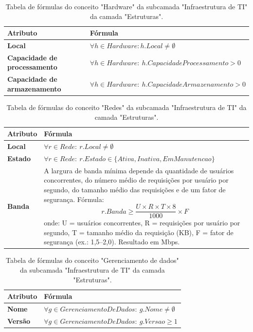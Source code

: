 \begin{apendicesenv}
\begin{table}[H]
\centering
\caption{Tabela de fórmulas do conceito "Hardware" da subcamada "Infraestrutura de TI" da camada "Estruturas".}
\begin{tabularx}{\textwidth}{|l|X|}
\hline
\textbf{Atributo} & \textbf{Fórmula} \\ \hline
\textbf{Local} & $\forall h \in Hardware: h.Local \neq \emptyset$ \\ \hline
\textbf{Capacidade de processamento}  & $\forall h \in Hardware:\ h.CapacidadeProcessamento > 0$ \\ \hline
\textbf{Capacidade de armazenamento} & $\forall h \in Hardware:\ h.CapacidadeArmazenamento > 0$ \\ \hline
\end{tabularx}
\end{table}

\begin{table}[H]
\centering
\caption{Tabela de fórmulas do conceito "Redes" da subcamada "Infraestrutura de TI" da camada "Estruturas".}
\begin{tabularx}{\textwidth}{|l|X|}
\hline
\textbf{Atributo} & \textbf{Fórmula} \\ \hline
\textbf{Local}  & $\forall r \in Rede:\ r.Local \neq \emptyset$ \\ \hline
\textbf{Estado} & $\forall r \in Rede:\ r.Estado \in \{Ativa, Inativa, EmManutencao\}$ \\ \hline
\textbf{Banda} & 
\parbox[t]{0.8\linewidth}{
A largura de banda mínima depende da quantidade de usuários concorrentes, do número médio de requisições por usuário por segundo, do tamanho médio das requisições e de um fator de segurança.  
Fórmula: 
\[
r.Banda \ge \frac{U \times R \times T \times 8}{1000} \times F
\]  
onde: 
U = usuários concorrentes,  
R = requisições por usuário por segundo,  
T = tamanho médio da requisição (KB),  
F = fator de segurança (ex.: 1,5–2,0).  
Resultado em Mbps.
} \\ \hline
\textbf{Segurança} & $\forall r \in Rede:\ r.Seguranca \in \{\text{Alta, Média, Baixa}\}$ \\ \hline
\end{tabularx}
\end{table}

\begin{table}[H]
\centering
\caption{Tabela de fórmulas do conceito "Gerenciamento de dados" da subcamada "Infraestrutura de TI" da camada "Estruturas".}
\begin{tabularx}{\textwidth}{|l|X|}
\hline
\textbf{Atributo} & \textbf{Fórmula} \\ \hline
\textbf{Nome} & $\forall g \in GerenciamentoDeDados:\ g.Nome \neq \emptyset$ \\ \hline
\textbf{Versão} & $\forall g \in GerenciamentoDeDados:\ g.Versao \ge 1$ \\ \hline
\end{tabularx}
\end{table}


\end{apendicesenv}
